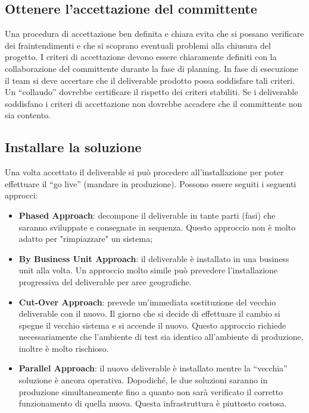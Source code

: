 \subsection{Ottenere l’accettazione del committente}
Una procedura di accettazione ben definita e chiara evita che si possano verificare dei fraintendimenti e che si scoprano eventuali problemi alla chiusura del progetto. I criteri di accettazione devono essere chiaramente definiti con la collaborazione del committente durante la fase di planning. In fase di esecuzione il team si deve accertare che il deliverable prodotto possa soddisfare tali criteri. Un “collaudo” dovrebbe certificare il rispetto dei criteri stabiliti. Se i deliverable soddisfano i criteri di accettazione non dovrebbe accadere che il committente non sia contento.

\subsection{Installare la soluzione}
Una volta accettato il deliverable si può procedere all’installazione per poter effettuare il “go live” (mandare in produzione). Possono essere seguiti i seguenti approcci:
\begin{itemize}
	\item \textbf{Phased Approach}: decompone il deliverable in tante parti (fasi) che saranno sviluppate e consegnate in sequenza. Questo approccio non è molto adatto per "rimpiazzare" un sistema;
	\item \textbf{By Business Unit Approach}: il deliverable è installato in una business unit alla volta. Un approccio molto simile può prevedere l’installazione progressiva del deliverable per aree geografiche.
	\item \textbf{Cut-Over Approach}: prevede un’immediata sostituzione del vecchio deliverable con il nuovo. Il giorno che si decide di effettuare il cambio si spegne il vecchio sistema e si accende il nuovo. Questo approccio richiede necessariamente che l’ambiente di test sia identico all’ambiente di produzione, inoltre è molto rischioso.
	\item \textbf{Parallel Approach}: il nuovo deliverable è installato mentre la “vecchia” soluzione è ancora operativa. Dopodiché, le due soluzioni saranno in produzione simultaneamente fino a quanto non sarà verificato il corretto funzionamento di quella nuova. Questa infrastruttura è piuttosto costosa.
\end{itemize}
